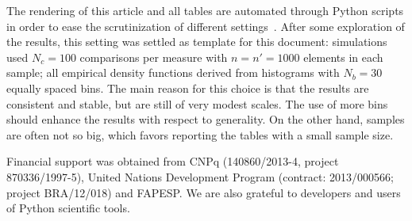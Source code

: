\documentclass[%
	aip,
	jmp,%
	amsmath,amssymb,
	reprint,%
]{revtex4-1}
\begin{document}
The rendering of this article and all tables
are automated through Python scripts
in order to ease the scrutinization of different settings~\cite{gmanePack}.
After some exploration of  the results,
this setting was settled as template for this document:
simulations used $N_c=100$ comparisons per measure with
$n=n'=1000$ elements in each sample;
all empirical density functions
derived from histograms with 
$N_b=30$ equally spaced bins.
The main reason for this choice is that
the results are consistent and stable,
but are still of very modest scales.
The use of more bins 
should enhance the results with respect to generality.
On the other hand, samples are often not so big,
which favors reporting the tables with a small sample size.




\begin{acknowledgments}
	Financial support was obtained from CNPq (140860/2013-4,
	project 870336/1997-5), United Nations Development Program (contract: 2013/000566; project BRA/12/018) and FAPESP. 
	We are also grateful to developers and users of Python scientific tools.
\end{acknowledgments}


\end{document}
